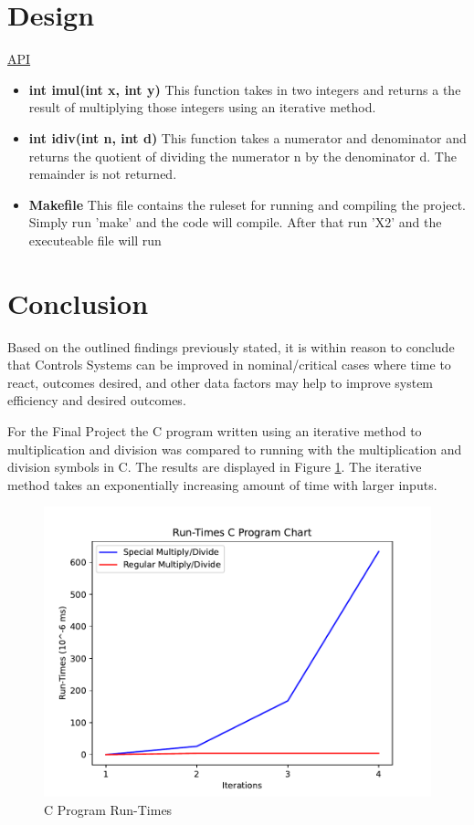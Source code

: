 \documentclass{IEEEtran}
\begin{document}
\section{Design}

\underline{API}

\begin{itemize}
    \item \textbf{int imul(int x, int y)}
    \newline
    This function takes in two integers and returns a the result of multiplying those integers using an iterative method.

    \item \textbf{int idiv(int n, int d)}
    \newline
    This function takes a numerator and denominator and returns the quotient of dividing the numerator n by the denominator d. The remainder is not returned.

    \item \textbf{Makefile}
    \newline
    This file contains the ruleset for running and compiling the project. Simply run 'make' and the code will compile. After that run 'X2' and the executeable file will run

    
    
\end{itemize}

\section{Conclusion}

Based on the outlined findings previously stated, it is within reason to conclude that Controls Systems can be improved in nominal/critical cases where time to react, outcomes desired, and other data factors may help to improve system efficiency and desired outcomes. 

For the Final Project the C program written using an iterative method to multiplication and division was compared to running with the multiplication and division symbols in C.  The results are displayed in Figure \ref{fig:graph2}. The iterative method takes an exponentially increasing amount of time with larger inputs.  

\begin{figure}[h]
    \centering
    \includegraphics[width=0.65\linewidth]{ECGR5100_FinalProj.pdf}
    \caption{\label{fig:graph2} C Program Run-Times }
\end{figure}
\end{document}
